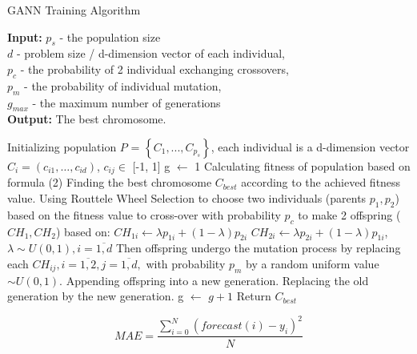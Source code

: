 \documentclass[conference]{IEEEtran}
\begin{document}
\begin{algorithm}[h]
	\caption{GANN Training Algorithm}\label{algo_GA}
	\hspace*{\algorithmicindent} \textbf{Input:} 
	\textbf{ $p_s$ } - the population size \\
	\hspace*{\algorithmicindent} \textbf{$d$} - problem size / d-dimension vector of each individual,\\
	\hspace*{\algorithmicindent} \textbf{ $p_c$ } - the probability of 2 individual exchanging crossovers,\\
	\hspace*{\algorithmicindent} \textbf{$p_m$ } - the probability of individual mutation, \\
	\hspace*{\algorithmicindent} \textbf{$g_{max}$} - the maximum number of generations \\
	\hspace*{\algorithmicindent} \textbf{Output:} The best chromosome. 
	
	\begin{algorithmic}[1]
		\STATE Initializing population $P$ = $ \left\{ C_1,. . . , C_{p_s} \right\}$, each individual is a d-dimension vector $C_i = (c_{i1}, …, c_{id})$, $c_{ij} \in $ [-1, 1]
		\STATE g $\leftarrow$ 1 
		\STATE Calculating fitness of population based on formula (2)
		\STATE Finding the best chromosome $C_{best}$ according to the achieved fitness value.
		\REPEAT 
		\STATE Using Routtele Wheel Selection to choose two individuals (parents $p_1, p_2$) based on the fitness value to cross-over with probability $p_c$ to make 2 offspring ($CH_1, CH_2$) based on:
		\STATE 	$CH_{1i} \leftarrow \lambda p_{1i} + (1- \lambda)p_{2i}$
		\STATE	$CH_{2i} \leftarrow \lambda p_{2i} + (1- \lambda)p_{1i}$, 		$ \lambda \sim U(0,1), i = \overline{1, d} $
		\STATE Then offspring undergo the mutation process by replacing each $CH_{ij}, i = \overline{1, 2}, j = \overline{1, d},$ with probability $p_m$ by a random uniform value $\sim U(0,1)$.
		\STATE Appending offspring into a new generation.
		\STATE Replacing the old generation by the new generation. 
		\STATE g $\leftarrow$ $g + 1$
		\ENDWHILE
		\STATE Return $C_{best}$
	\end{algorithmic}
\end{algorithm}

\begin{equation} 
MAE = \frac{\sum_{i=0}^N( forecast(i) - y_i)^2}{N}	\label{eq_MAE}
\end{equation}
\end{document}
